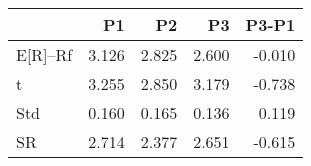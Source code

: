 \begin{tabular}{lrrrr}
\toprule
 & P1 & P2 & P3 & P3-P1 \\
\midrule
E[R]--Rf & 3.126 & 2.825 & 2.600 & -0.010 \\
t & 3.255 & 2.850 & 3.179 & -0.738 \\
Std & 0.160 & 0.165 & 0.136 & 0.119 \\
SR & 2.714 & 2.377 & 2.651 & -0.615 \\
\bottomrule
\end{tabular}
